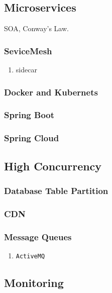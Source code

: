 \documentclass[11pt, twocolumn]{article}
\begin{document}
\subsection{Microservices}
SOA, Conway's Law.

\subsubsection{SeviceMesh}
\begin{enumerate}
	\item sidecar
\end{enumerate}

\subsubsection{Docker and Kubernets}

\subsubsection{Spring Boot}

\subsubsection{Spring Cloud}

\subsection{High Concurrency}

\subsubsection{Database Table Partition}

\subsubsection{CDN}

\subsubsection{Message Queues}
\begin{enumerate}
	\item \texttt{ActiveMQ}
\end{enumerate}

\subsection{Monitoring}
\end{document}

